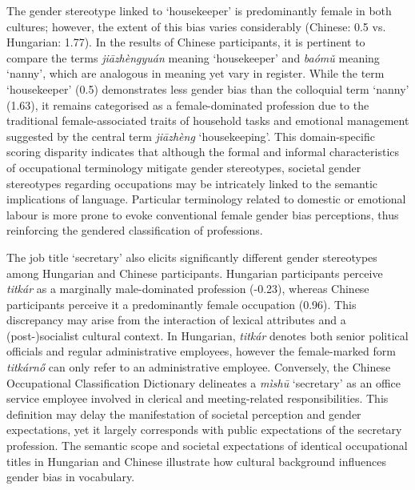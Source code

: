 \documentclass[11pt]{article}
\newcommand{\zh}[1]{\simplifiedchinesefont{#1}\rmfamily}
\begin{document}


The gender stereotype linked to `housekeeper' is predominantly female in both cultures; however, the extent of this bias varies considerably (Chinese: 0.5 vs. Hungarian: 1.77). In the results of Chinese participants, it is pertinent to compare the terms \zh{家政员} \textit{jiāzhèngyuán} meaning `housekeeper' and \zh{保姆} \textit{baómǔ} meaning `nanny', which are analogous in meaning yet vary in register. While the term `housekeeper' (0.5) demonstrates less gender bias than the colloquial term `nanny' (1.63), it remains categorised as a female-dominated profession due to the traditional female-associated traits of household tasks and emotional management suggested by the central term \zh{家政} \textit{jiāzhèng} `housekeeping'. This domain-specific scoring disparity indicates that although the formal and informal characteristics of occupational terminology mitigate gender stereotypes, societal gender stereotypes regarding occupations may be intricately linked to the semantic implications of language. Particular terminology related to domestic or emotional labour is more prone to evoke conventional female gender bias perceptions, thus reinforcing the gendered classification of professions.

The job title `secretary' also elicits significantly different gender stereotypes among Hungarian and Chinese participants. Hungarian participants perceive \textit{titkár} as a marginally male-dominated profession (-0.23), whereas Chinese participants perceive it a predominantly female occupation (0.96). This discrepancy may arise from the interaction of lexical attributes and a (post-)socialist cultural context. In Hungarian, \textit{titkár} denotes both senior political officials and regular administrative employees, however the female-marked form \textit{titkárnő} can only refer to an administrative employee. Conversely, the Chinese Occupational Classification Dictionary delineates a \zh{秘书} \textit{mìshū} `secretary' as an office service employee involved in clerical and meeting-related responsibilities. This definition may delay the manifestation of societal perception and gender expectations, yet it largely corresponds with public expectations of the secretary profession. The semantic scope and societal expectations of identical occupational titles in Hungarian and Chinese illustrate how cultural background influences gender bias in vocabulary.
\end{document}

